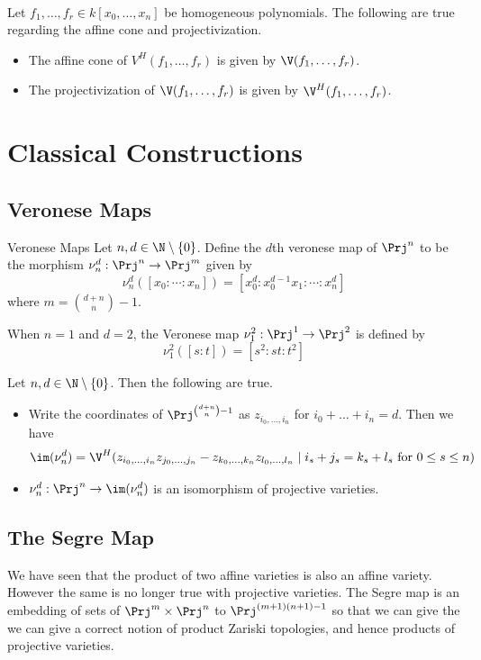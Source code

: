 \documentclass[a4paper]{article}
\begin{document}
\begin{prp}{}{}\\
Let $f_1,\dots,f_r\in k[x_0,\dots,x_n]$ be homogeneous polynomials. The following are true regarding the affine cone and projectivization. 
\begin{itemize}
\item The affine cone of $V^H(f_1,\dots,f_r)$ is given by $\V(f_1,\dots,f_r)$. 
\item The projectivization of $\V(f_1,\dots,f_r)$ is given by $\V^H(f_1,\dots,f_r)$. 
\end{itemize}
\end{prp}

\pagebreak
\section{Classical Constructions}
\subsection{Veronese Maps}
\begin{defn}{Veronese Maps}{} Let $n,d\in\N\setminus\{0\}$. Define the $d$th veronese map of $\Prj^n$ to be the morphism $\nu_n^d:\Prj^n\to\Prj^m$ given by $$\nu_n^d([x_0:\cdots:x_n])=[x_0^d:x_0^{d-1}x_1:\cdots:x_n^d]$$ where $m=\binom{d+n}{n}-1$. 
\end{defn}

When $n=1$ and $d=2$, the Veronese map $\nu_1^2:\Prj^1\to\Prj^2$ is defined by $$\nu_1^2([s:t])=[s^2:st:t^2]$$

\begin{prp}{}{} Let $n,d\in\N\setminus\{0\}$. Then the following are true. 
\begin{itemize}
\item Write the coordinates of $\Prj^{\binom{d+n}{n}-1}$ as $z_{i_0,\dots,i_n}$ for $i_0+\dots+i_n=d$. Then we have $$\im(\nu_n^d)=\V^H(z_{i_0,\dots,i_n}z_{j_0,\dots,j_n}-z_{k_0,\dots,k_n}z_{l_0,\dots,l_n}\;|\;i_s+j_s=k_s+l_s\text{ for }0\leq s\leq n)$$
\item $\nu_n^d:\Prj^n\to\im(\nu_n^d)$ is an isomorphism of projective varieties. 
\end{itemize}
\end{prp}

\subsection{The Segre Map}
We have seen that the product of two affine varieties is also an affine variety. However the same is no longer true with projective varieties. The Segre map is an embedding of sets of $\Prj^m\times\Prj^n$ to $\Prj^{(m+1)(n+1)-1}$ so that we can give the we can give a correct notion of product Zariski topologies, and hence products of projective varieties. 
\end{document}
